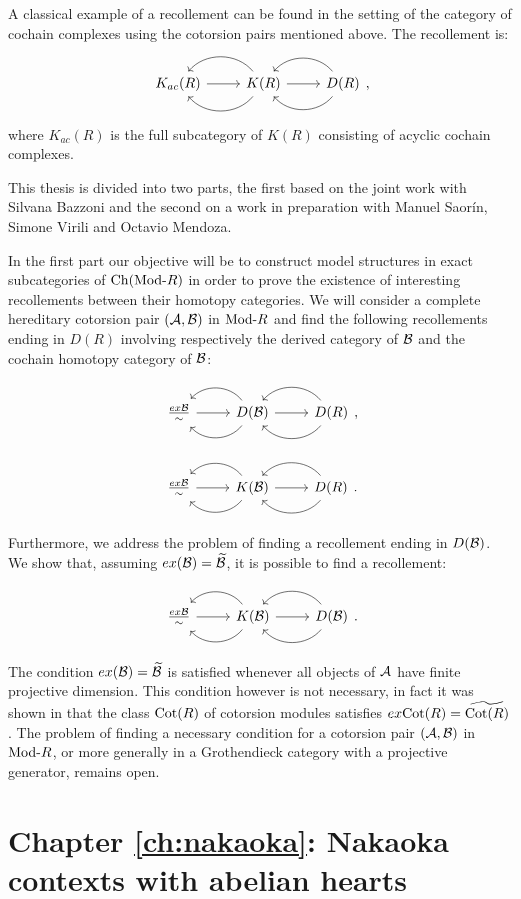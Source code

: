 A classical example of a recollement can be found in the setting of the category of cochain complexes using the cotorsion pairs mentioned above. The recollement is:
\begin{equation*}
\recdiagram{K_{ac}(R)}{K(R)}{D(R)},
\end{equation*}
where $K_{ac}(R)$ is the full subcategory of $K(R)$ consisting of acyclic cochain complexes.

This thesis is divided into two parts, the first based on the joint work \cite{bazzoni2018recollements} with Silvana Bazzoni and the second on a work in preparation with Manuel Saor\'in, Simone Virili and Octavio Mendoza.

\smallskip

In the first part our objective will be to construct model structures in exact subcategories of $\mathrm{Ch}(\mathrm{Mod}\textrm{-}R)$ in order to prove the existence of interesting recollements between their homotopy categories. We will consider a complete hereditary cotorsion pair $(\mathcal{A},\mathcal{B})$ in $\mathrm{Mod}\textrm{-}R$ and find the following recollements ending in $D(R)$ involving respectively the derived category of $\mathcal{B}$ and the cochain homotopy category of $\mathcal{B}$:

\begin{equation*}
  \recdiagram{\frac{ex \B}{\sim}}{D(\B)}{D(R)},
\end{equation*}

\begin{equation*}
  \recdiagram{\frac{ex \B}{\sim}}{K(\B)}{D(R)}.
\end{equation*}

Furthermore, we address the problem of finding a recollement ending in $D(\mathcal{B})$. We show that, assuming $ex(\mathcal{B})=\widetilde{\mathcal{B}}$, it is possible to find a recollement:

\begin{equation*}
  \recdiagram{\frac{ex \B}{\sim}}{K(\B)}{D(\B)}.
\end{equation*}

The condition $ex(\mathcal{B})=\widetilde{\mathcal{B}}$ is satisfied whenever all objects of $\mathcal{A}$ have finite projective dimension. This condition however is not necessary, in fact it was shown in \cite{BCIE} that the class $\mathrm{Cot}(R)$ of cotorsion modules satisfies $ex\mathrm{Cot}(R)=\widetilde{\mathrm{Cot}(R)}$. The problem of finding a necessary condition for a cotorsion pair $(\mathcal{A},\mathcal{B})$ in $\mathrm{Mod}\textrm{-}R$, or more generally in a Grothendieck category with a projective generator, remains open.

\section*{Chapter \ref{ch:nakaoka}: Nakaoka contexts with abelian hearts}


